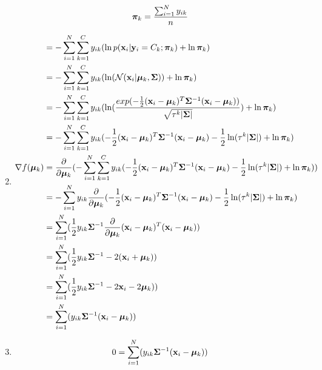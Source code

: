 \documentclass[submit]{harvardml}
\begin{document}
\begin{enumerate}
    \begin{equation}
        \begin{split}
            \boldsymbol{\pi}_k &= \frac{\sum_{i=1}^{N}  y_{ik}}{n} \\
        \end{split}
    \end{equation}
    \item
    \begin{equation}
        \begin{split}
            &= -\sum_{i=1}^{N} \sum_{k=1}^{C} y_{ik} (\ln p(\mathbf{x}_i | \mathbf{y}_i = C_k; \boldsymbol{\pi}_k) + \ln \boldsymbol{\pi}_k) \\
            &= -\sum_{i=1}^{N} \sum_{k=1}^{C} y_{ik} (\ln (\mathcal{N}(\mathbf{x}_i |  \boldsymbol{\mu}_k, \mathbf{\Sigma})) + \ln \boldsymbol{\pi}_k) \\
            &= -\sum_{i=1}^{N} \sum_{k=1}^{C} y_{ik} (\ln (\frac{exp(-\frac{1}{2}(\mathbf{x}_i-\boldsymbol{\mu}_k)^T\mathbf{\Sigma}^{-1}(\mathbf{x}_i-\boldsymbol{\mu}_k))}{\sqrt{\tau^k|\mathbf{\Sigma}|}}) + \ln \boldsymbol{\pi}_k) \\
            &= -\sum_{i=1}^{N} \sum_{k=1}^{C} y_{ik} (-\frac{1}{2}(\mathbf{x}_i-\boldsymbol{\mu}_k)^T\mathbf{\Sigma}^{-1}(\mathbf{x}_i-\boldsymbol{\mu}_k)- \frac{1}{2}\ln(\tau^k|\mathbf{\Sigma}|) + \ln \boldsymbol{\pi}_k) \\
            \nabla f(\boldsymbol{\mu}_{k})&= \frac{\partial}{\partial \boldsymbol{\mu}_k}(-\sum_{i=1}^{N} \sum_{k=1}^{C} y_{ik} (-\frac{1}{2}(\mathbf{x}_i-\boldsymbol{\mu}_k)^T\mathbf{\Sigma}^{-1}(\mathbf{x}_i-\boldsymbol{\mu}_k)- \frac{1}{2}\ln(\tau^k|\mathbf{\Sigma}|) + \ln \boldsymbol{\pi}_k)) \\
            &= -\sum_{i=1}^{N}  y_{ik}\frac{\partial}{\partial \boldsymbol{\mu}_k} (-\frac{1}{2}(\mathbf{x}_i-\boldsymbol{\mu}_k)^T\mathbf{\Sigma}^{-1}(\mathbf{x}_i-\boldsymbol{\mu}_k)- \frac{1}{2}\ln(\tau^k|\mathbf{\Sigma}|) + \ln \boldsymbol{\pi}_k) \\
            &= \sum_{i=1}^{N}  (\frac{1}{2}y_{ik}\mathbf{\Sigma}^{-1}\frac{\partial}{\partial \boldsymbol{\mu}_k}(\mathbf{x}_i-\boldsymbol{\mu}_k)^T(\mathbf{x}_i-\boldsymbol{\mu}_k)) \\
            &= \sum_{i=1}^{N}   (\frac{1}{2}y_{ik}\mathbf{\Sigma}^{-1}-2(\mathbf{x}_i+\boldsymbol{\mu}_k)) \\
            &= \sum_{i=1}^{N}   (\frac{1}{2}y_{ik}\mathbf{\Sigma}^{-1}-2\mathbf{x}_i-2\boldsymbol{\mu}_k)) \\
            &= \sum_{i=1}^{N}   (y_{ik}\mathbf{\Sigma}^{-1}(\mathbf{x}_i - \boldsymbol{\mu}_k)) \\
        \end{split}
    \end{equation}
    \item
    \begin{equation}
        \begin{split}
            0 &= \sum_{i=1}^{N}   (y_{ik}\bSigma^{-1}(\boldx_i - \bmu_k)) \\

\end{split}
\end{equation}
\end{enumerate}
\end{document}
